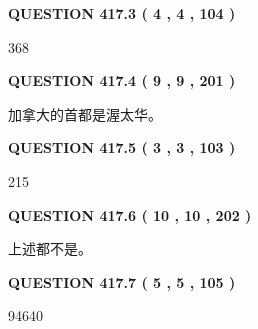 \documentclass{ctexart}
\begin{document}
 
  
\vspace{0.2in}
  
{\textbf{\Large{QUESTION
417.3 
 ( 4 , 4 , 104 )
}}}
  
  
 
 
\noindent{}

368
 
 
  
\vspace{0.2in}
  
{\textbf{\Large{QUESTION
417.4 
 ( 9 , 9 , 201 )
}}}
  
  
 
 
\noindent{}
 
 
加拿大的首都是渥太华。
 
 
 
 
  
\vspace{0.2in}
  
{\textbf{\Large{QUESTION
417.5 
 ( 3 , 3 , 103 )
}}}
  
  
 
 
\noindent{}

215
 
 
  
\vspace{0.2in}
  
{\textbf{\Large{QUESTION
417.6 
 ( 10 , 10 , 202 )
}}}
  
  
 
 
\noindent{}
 
 
 上述都不是。
 
 
 
 
  
\vspace{0.2in}
  
{\textbf{\Large{QUESTION
417.7 
 ( 5 , 5 , 105 )
}}}
  
  
 
 
\noindent{}

94640
 
 
  
\vspace{0.2in}
  
\end{document}
